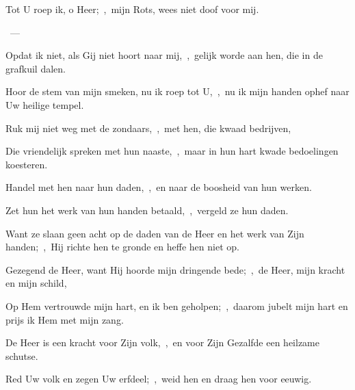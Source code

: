 \documentclass[12pt,twoside,a5paper]{article}
\begin{document}
\begin{halfparskip}
   
\end{halfparskip}

\begin{halfparskip}
   Tot U roep ik, o Heer;~\sep\ mijn Rots, wees niet doof voor mij.

  ~--- 

  Opdat ik niet, als Gij niet hoort naar mij,~\sep\ gelijk worde aan hen, die in de grafkuil dalen.

  Hoor de stem van mijn smeken, nu ik roep tot U,~\sep\ nu ik mijn handen ophef naar Uw heilige tempel.

  Ruk mij niet weg met de zondaars,~\sep\ met hen, die kwaad bedrijven,

  Die vriendelijk spreken met hun naaste,~\sep\ maar in hun hart kwade bedoelingen koesteren.

  Handel met hen naar hun daden,~\sep\ en naar de boosheid van hun werken.

  Zet hun het werk van hun handen betaald,~\sep\ vergeld ze hun daden.

  Want ze slaan geen acht op de daden van de Heer en het werk van Zijn handen;~\sep\ Hij richte hen te gronde en heffe hen niet op.

  Gezegend de Heer, want Hij hoorde mijn dringende bede;~\sep\ de Heer, mijn kracht en mijn schild,

  Op Hem vertrouwde mijn hart, en ik ben geholpen;~\sep\ daarom jubelt mijn hart en prijs ik Hem met mijn zang.

  De Heer is een kracht voor Zijn volk,~\sep\ en voor Zijn Gezalfde een heilzame schutse.

  Red Uw volk en zegen Uw erfdeel;~\sep\ weid hen en draag hen voor eeuwig.
\end{halfparskip}
\end{document}
